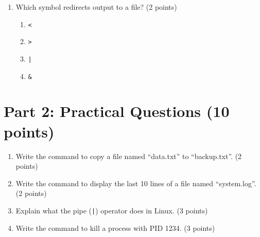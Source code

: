 \documentclass[11pt,a4paper]{article}
\begin{document}
{\begin{enumerate}[label=\textbf{\arabic*.}]
    \item Which symbol redirects output to a file? (2 points)
    \begin{enumerate}[label=(\alph*)]
        \item \texttt{<}
        \item \texttt{>}
        \item \texttt{|}
        \item \texttt{\&}
    \end{enumerate}
\end{enumerate}

\section*{Part 2: Practical Questions (10 points)}

\begin{enumerate}[label=\textbf{\arabic*.}, resume]
    \item Write the command to copy a file named ``data.txt'' to ``backup.txt''. (2 points)
    
    \vspace{2cm}
    
    \item Write the command to display the last 10 lines of a file named ``system.log''. (2 points)
    
    \vspace{2cm}
    
    \item Explain what the pipe (\texttt{|}) operator does in Linux. (3 points)
    
    \vspace{3cm}
    
    \item Write the command to kill a process with PID 1234. (3 points)
    
    \vspace{3cm}
\end{enumerate}
}
\end{document}
